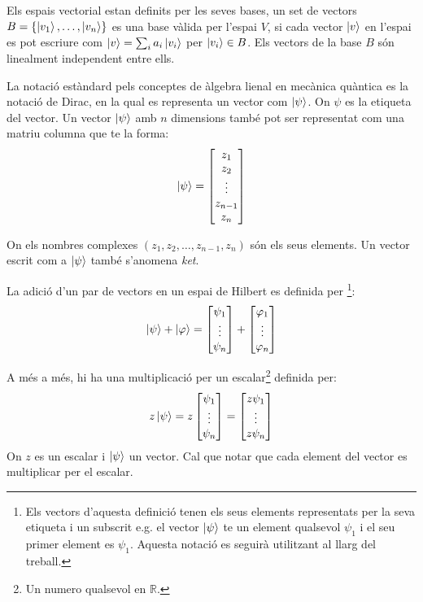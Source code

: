 Els espais vectorial estan definits per les seves bases, un set de vectors $B = \{\ket{v_1}, \dots, \ket{v_n}\}$ es una base vàlida per l'espai $V$, si cada vector $\ket{v}$ en l'espai es pot escriure com $\ket{v} = \sum_i a_i \ket{v_i}$ per $\ket{v_i} \in B$. Els vectors de la base $B$ són linealment independent entre ells.

La notació estàndard pels conceptes de  àlgebra lienal en mecànica quàntica es la notació de Dirac, en la qual es representa un vector com $ \ket{\psi} $. On $\psi$ es la etiqueta del vector. Un vector $ \ket{\psi} $ amb $n$ dimensions també pot ser representat com una matriu columna que te la forma: 
$$
\ket{\psi} = 
\begin{bmatrix}
	z_{1} \\
	z_{2} \\
	\vdots \\
	z_{n-1} \\
	z_{n}
\end{bmatrix}
$$

On els nombres complexes $(z_{1}, z_{2}, \dots , z_{n-1}, z_{n} )$ són els seus elements. Un vector escrit com a $\ket{\psi}$ també s'anomena \textit{ket}.

La adició d'un par de vectors en un espai de Hilbert es definida per \footnote{Els vectors d'aquesta definició tenen els seus elements representats per la seva etiqueta i un subscrit e.g. el vector $\ket{\psi}$ te un element qualsevol $\psi_{1}$ i el seu primer element es $\psi_{1}$. Aquesta notació es seguirà utilitzant al llarg del treball.}:
$$
\ket{\psi} + \ket{\varphi} = \begin{bmatrix} \psi_{1} \\ \vdots \\ \psi_{n} \end{bmatrix} +
\begin{bmatrix} \varphi_{1} \\ \vdots \\ \varphi_{n} \end{bmatrix}
$$

A més a més, hi ha una multiplicació per un escalar\footnote{Un numero qualsevol en $\mathbb{R}$.} definida per:
$$
  z\ket{\psi} = z\begin{bmatrix} \psi_{1} \\ \vdots \\ \psi_{n} \end{bmatrix} = \begin{bmatrix} z \psi_{1} \\ \vdots \\ z \psi_{n} \end{bmatrix}
$$
On $z$ es un escalar i $\ket{\psi}$ un vector. Cal que notar que cada element del vector es multiplicar per el escalar.

